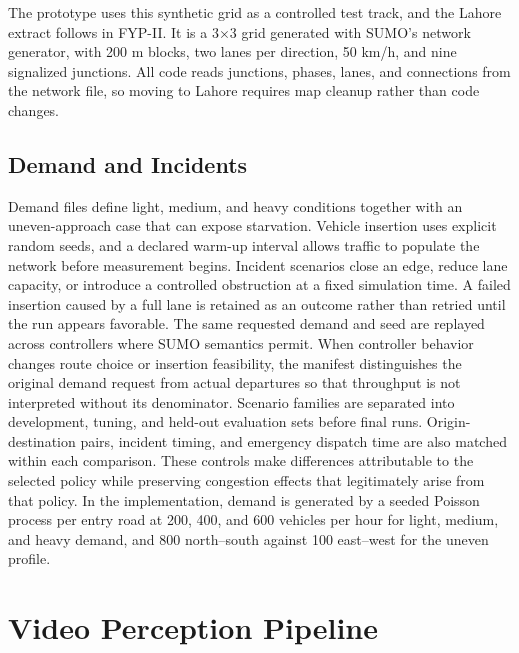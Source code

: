 The prototype uses this synthetic grid as a controlled test track, and the Lahore extract follows in FYP-II. It is a 3$\times$3 grid generated with SUMO's network generator, with 200 m blocks, two lanes per direction, 50 km/h, and nine signalized junctions. All code reads junctions, phases, lanes, and connections from the network file, so moving to Lahore requires map cleanup rather than code changes.

\subsection{Demand and Incidents}

Demand files define light, medium, and heavy conditions together with an uneven-approach case that can expose starvation. Vehicle insertion uses explicit random seeds, and a declared warm-up interval allows traffic to populate the network before measurement begins. Incident scenarios close an edge, reduce lane capacity, or introduce a controlled obstruction at a fixed simulation time. A failed insertion caused by a full lane is retained as an outcome rather than retried until the run appears favorable. The same requested demand and seed are replayed across controllers where SUMO semantics permit. When controller behavior changes route choice or insertion feasibility, the manifest distinguishes the original demand request from actual departures so that throughput is not interpreted without its denominator. Scenario families are separated into development, tuning, and held-out evaluation sets before final runs. Origin-destination pairs, incident timing, and emergency dispatch time are also matched within each comparison. These controls make differences attributable to the selected policy while preserving congestion effects that legitimately arise from that policy. In the implementation, demand is generated by a seeded Poisson process per entry road at 200, 400, and 600 vehicles per hour for light, medium, and heavy demand, and 800 north--south against 100 east--west for the uneven profile.

\section{Video Perception Pipeline}

